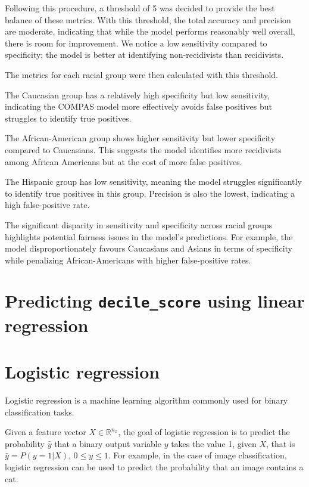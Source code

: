 \documentclass[conference]{IEEEtran}
\begin{document}
	Following this procedure, a threshold of 5 was decided to provide the best balance of these metrics. With this threshold, the total accuracy and precision are moderate, indicating that while the model performs reasonably well overall, there is room for improvement. We notice a low sensitivity compared to specificity; the model is better at identifying non-recidivists than recidivists.
	
	
	The metrics for each racial group were then calculated with this threshold.
	
	
	The Caucasian group has a relatively high specificity but low sensitivity, indicating the COMPAS model more effectively avoids false positives but struggles to identify true positives. 
	
	The African-American group shows higher sensitivity but lower specificity compared to Caucasians. This suggests the model identifies more recidivists among African Americans but at the cost of more false positives.
	
	
	The Hispanic group has low sensitivity, meaning the model struggles significantly to identify true positives in this group. Precision is also the lowest, indicating a high false-positive rate.
	
	
	The significant disparity in sensitivity and specificity across racial groups highlights potential fairness issues in the model's predictions. For example, the model disproportionately favours Caucasians and Asians in terms of specificity while penalizing African-Americans with higher false-positive rates.
	
	\section{Predicting \textbf{\texttt{decile\_score}} using linear regression}
	
	
	\section{Logistic regression}
	
	
	Logistic regression is a machine learning algorithm commonly used for binary classification tasks.
	
	Given a feature vector $X \in \mathbb{R}^{n_x}$, the goal of logistic regression is to predict the probability $\hat{y}$ that a binary output variable $y$ takes the value 1, given $X$, that is $\hat{y} = P(y=1|X)$, $0\le y\le1$. 
	For example, in the case of image classification, logistic regression can be used to predict the probability that an image contains a cat.
\end{document}
